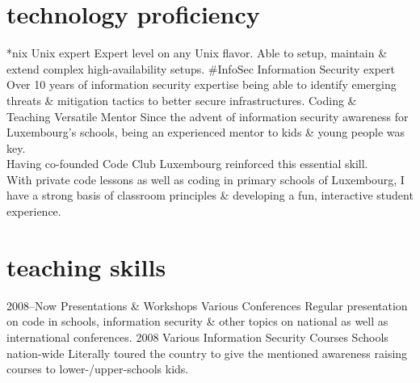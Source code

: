 \documentclass[]{friggeri-cv} %
\begin{document}

\section{technology proficiency}

\begin{entrylist}
\entry
{*nix}
{Unix expert}
{}
{Expert level on any Unix flavor. Able to setup, maintain \& extend complex high-availability setups.}
\entry
{\#InfoSec}
{Information Security expert}
{}
{Over 10 years of information security expertise being able to identify emerging threats \& mitigation tactics to better secure infrastructures.}
\entry
{Coding \& \\ Teaching}
{Versatile Mentor}
{}
{Since the advent of information security awareness for Luxembourg's schools, being an experienced mentor to kids \& young people was key. \\
Having co-founded Code Club Luxembourg reinforced this essential skill. \\
With private code lessons as well as coding in primary schools of Luxembourg, I have a strong basis of classroom principles \& developing a fun, interactive student experience.}
\end{entrylist}


\section{teaching skills}

\begin{entrylist}
\entry
{2008--Now}
{Presentations \& Workshops}
{Various Conferences}
{Regular presentation on code in schools, information security \& other topics on national as well as international conferences.}
\entry
{2008}
{Various Information Security Courses}
{Schools nation-wide}
{Literally toured the country to give the mentioned awareness raising courses to lower-/upper-schools kids.}
\end{entrylist}
\end{document}
